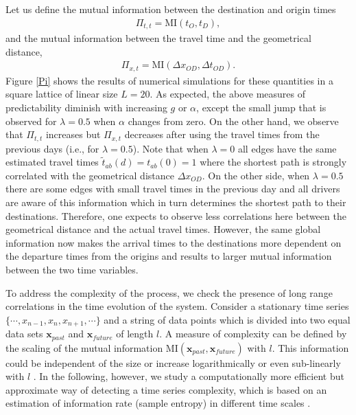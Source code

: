 \documentclass[aps,preprint]{revtex4-1}
\begin{document}
Let us define the mutual information between the destination and origin times
\begin{align}
\Pi_{t,t}=\mathrm{MI}(t_O,t_D),
\end{align}
and the mutual information between the travel time and the geometrical distance, 
\begin{align}
\Pi_{x,t}=\mathrm{MI}(\Delta x_{OD},\Delta t_{OD}).
\end{align}
Figure \ref{Pi} shows the results of numerical simulations for these quantities in a square lattice of linear size $L=20$.
As expected, the above measures of predictability diminish with increasing $g$ or $\alpha$, except the small jump that is observed 
for $\lambda=0.5$ when $\alpha$ changes from zero.  On the other hand, we observe that $\Pi_{t,t}$ increases but $\Pi_{x,t}$ decreases after using the travel times from the previous days (i.e., for $\lambda=0.5$). Note that when $\lambda=0$ all edges have the same estimated travel times $\tilde{t}_{ab}(d)=t_{ab}(0)=1$ where the shortest path is strongly correlated with the geometrical distance $\Delta x_{OD}$. On the other side, when $\lambda=0.5$ there are some edges with small travel times in the previous day and all drivers are aware of this information which in turn determines the shortest path to their destinations. Therefore, one expects to observe less correlations here between the geometrical distance and the actual travel times. However, the same global information now makes the arrival times to the destinations more dependent on the departure times from the origins and results to larger mutual information between the two time variables. 


To address the complexity of the process, we check the presence of long range correlations in the time evolution of the system. 
Consider a stationary time series $\{\cdots,x_{n-1},x_n,x_{n+1},\cdots\}$ and a string of data points which is divided into two equal data sets $\mathbf{x}_{past}$ and $\mathbf{x}_{future}$ of length $l$. A measure of complexity can be defined by the scaling of the mutual information $\mathrm{MI}(\mathbf{x}_{past},\mathbf{x}_{future})$ with $l$. This information could be independent of the size or increase logarithmically or even sub-linearly with $l$ \cite{bialek-nc-2001}. In the following, however, we study a computationally more efficient but approximate way of detecting a time series complexity, which is based on an estimation of information rate (sample entropy) in different time scales \cite{samp-ajp-2000,costa-prl-2002}. 
\end{document}

